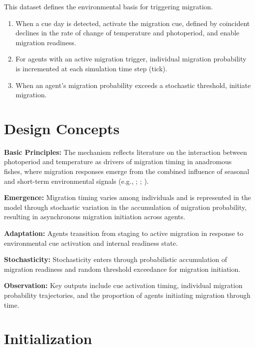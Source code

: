 \documentclass[
]{book}
\begin{document}
This dataset defines the environmental basis for triggering migration.

\begin{enumerate}
\def\labelenumi{\arabic{enumi}.}
\setcounter{enumi}{1}
\item
  When a cue day is detected, activate the migration cue, defined by
  coincident declines in the rate of change of temperature and
  photoperiod, and enable migration readiness.
\item
  For agents with an active migration trigger, individual migration
  probability is incremented at each simulation time step (tick).
\item
  When an agent's migration probability exceeds a stochastic
  threshold, initiate migration.
\end{enumerate}

\section{Design Concepts}\label{design-concepts-3}

\textbf{Basic Principles:} The mechanism reflects literature on the
interaction between photoperiod and temperature as drivers of migration
timing in anadromous fishes, where migration responses emerge from the
combined influence of seasonal and short-term environmental signals
(e.g., \citet{zydlewski_photoperiod_2014}; \citet{garcia-vega_upstream_2022};
\citet{jonsson_environmental_1991}).

\textbf{Emergence:} Migration timing varies among individuals
\citep{dingle_2014_migration} and is represented in the model through
stochastic variation in the accumulation of migration probability,
resulting in asynchronous migration initiation across agents.

\textbf{Adaptation:} Agents transition from staging to active migration in
response to environmental cue activation and internal readiness state.

\textbf{Stochasticity:} Stochasticity enters through probabilistic
accumulation of migration readiness and random threshold exceedance for
migration initiation.

\textbf{Observation:} Key outputs include cue activation timing, individual
migration probability trajectories, and the proportion of agents
initiating migration through time.

\section{Initialization}\label{initialization-3}
\end{document}

